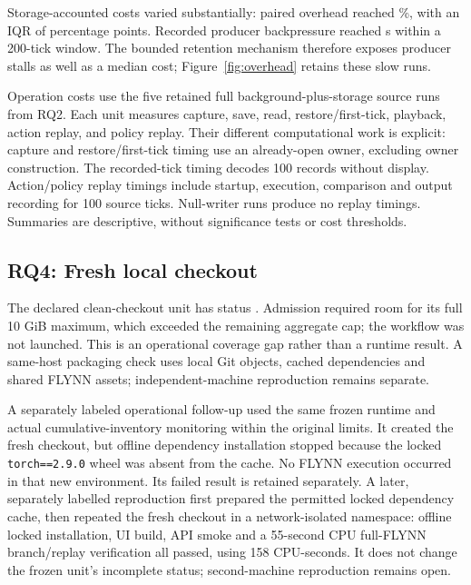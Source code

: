 \documentclass[10pt]{article}
\newcommand{\studyinput}[1]{}
\begin{document}
Storage-accounted costs varied substantially: paired overhead reached
\StorageOverheadMaximum{}\%, with an IQR of \StorageOverheadIQR{} percentage
points. Recorded producer backpressure reached
\StorageBackpressureMaximumSeconds{} s within a 200-tick window. The bounded
retention mechanism therefore exposes producer stalls as well as a median cost;
Figure~\ref{fig:overhead} retains these slow runs.

Operation costs use the five retained full background-plus-storage source runs
from RQ2. Each unit measures capture, save, read, restore/first-tick, playback,
action replay, and policy replay. Their different computational work is explicit:
capture and restore/first-tick timing use an already-open owner, excluding owner
construction. The recorded-tick timing decodes 100 records without display.
Action/policy replay timings include startup, execution, comparison and output
recording for 100 source ticks. Null-writer runs produce no replay timings.
Summaries are descriptive, without significance tests or cost thresholds.

\begin{table}[t]
\centering\small
\caption{Operation costs on retained RQ2 source runs. Each seed contributes one
operation unit; capture, serialization, restore, and the replay computations
measure different work.}
\label{tab:operation}\studyinput{operation-table}
\end{table}

\subsection{RQ4: Fresh local checkout}
The declared clean-checkout unit has status \OfflineStatus{}. Admission required
room for its full 10 GiB maximum, which exceeded the remaining aggregate cap;
the workflow was not launched. This is an operational coverage gap rather than
a runtime result. A same-host packaging check uses local Git objects, cached
dependencies and shared FLYNN assets; independent-machine reproduction remains
separate.

A separately labeled operational follow-up used the same frozen runtime and
actual cumulative-inventory monitoring within the original limits. It created
the fresh checkout, but offline dependency installation stopped because the
locked \texttt{torch==2.9.0} wheel was absent from the cache. No FLYNN execution
occurred in that new environment. Its failed result is retained separately.
A later, separately labelled reproduction first prepared the permitted locked
dependency cache, then repeated the fresh checkout in a network-isolated
namespace: offline locked installation, UI build, API smoke and a 55-second CPU
full-FLYNN branch/replay verification all passed, using 158 CPU-seconds. It
does not change the frozen unit's incomplete status; second-machine
reproduction remains open.
\end{document}
